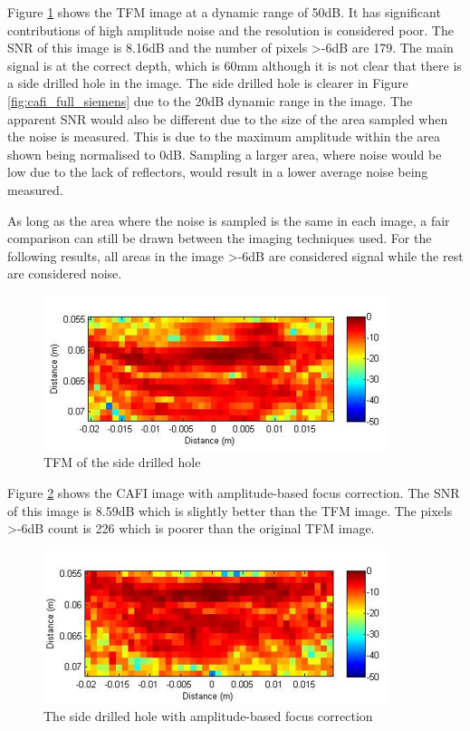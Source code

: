Figure \ref{fig:siemens_TFM} shows the TFM image at a dynamic range of 50dB. It has significant contributions of high amplitude noise and the resolution is considered poor. The SNR of this image is 8.16dB and the number of pixels \textgreater -6dB are 179. The main signal is at the correct depth, which is 60mm although it is not clear that there is a side drilled hole in the image. The side drilled hole is clearer in Figure \ref{fig:cafi_full_siemens} due to the 20dB dynamic range in the image. The apparent SNR would also be different due to the size of the area sampled when the noise is measured. This is due to the maximum amplitude within the area shown being normalised to 0dB. Sampling a larger area, where noise would be low due to the lack of reflectors, would result in a lower average noise being measured.

As long as the area where the noise is sampled is the same in each image, a fair comparison can still be drawn between the imaging techniques used. For the following results, all areas in the image \textgreater -6dB are considered signal while the rest are considered noise.

\begin{figure}[hp]
\centering
		\includegraphics[width=100mm]{siemens_TFM.png}
		\caption{TFM of the side drilled hole}
		\label{fig:siemens_TFM}
\end{figure}

Figure \ref{fig:siemens_CAFI_amp} shows the CAFI image with amplitude-based focus correction. The SNR of this image is 8.59dB which is slightly better than the TFM image. The pixels \textgreater -6dB count is 226 which is poorer than the original TFM image. 

\begin{figure}[hp]
\centering
		\includegraphics[width=100mm]{siemens_CAFI_amp.png}
		\caption{The side drilled hole with amplitude-based focus correction}
		\label{fig:siemens_CAFI_amp}
\end{figure}

